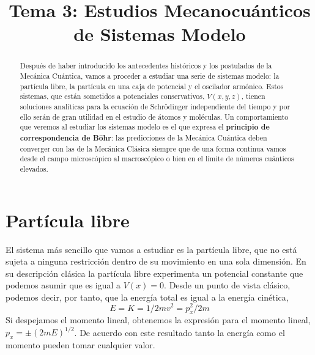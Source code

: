 \documentclass{tufte-handout}
\title[Química Física II: Tema 3 - Sistemas modelo]{
Tema 3: Estudios Mecanocuánticos de Sistemas Modelo}
\date{}  %
\begin{document}
\maketitle%

\begin{abstract}
\noindent Después de haber introducido los antecedentes históricos y los
postulados de la Mecánica Cuántica, vamos a proceder a 
estudiar una serie de sistemas modelo: la partícula libre, la
partícula en una caja de potencial y el oscilador armónico.
Estos sistemas, que están sometidos a potenciales conservativos,
$V(x,y,z)$, tienen soluciones analíticas para la ecuación 
de Schrödinger independiente del tiempo y por ello serán de gran
utilidad en el estudio de átomos y moléculas. Un comportamiento
que veremos al estudiar los sistemas modelo es el que expresa
el \textbf{principio de correspondencia de Böhr}:
las predicciones de la Mecánica Cuántica deben converger con 
las de la Mecánica Clásica siempre que de una forma continua vamos 
desde el campo microscópico al macroscópico o bien en el límite   
de números cuánticos elevados.

\end{abstract}




\section*{}
\section{Partícula libre}
El sistema más sencillo que vamos a estudiar es la partícula libre,
que no está sujeta a ninguna restricción dentro de su movimiento
en una sola dimensión. En su descripción clásica la partícula libre
experimenta un potencial constante que podemos asumir que es igual a
$V(x)=0$. Desde un punto de vista clásico, podemos decir, por tanto,
que la energía total es igual a la energía cinética,
\begin{equation}
    E=K=1/2mv^2=p_x^2/2m
\end{equation}
Si despejamos el momento lineal, obtenemos la expresión para el
momento lineal, $p_x=\pm(2mE)^{1/2}$. De acuerdo con este resultado
tanto la energía como el momento pueden tomar cualquier valor.
\end{document}
